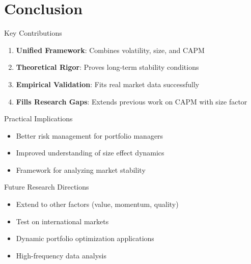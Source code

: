 \documentclass{beamer}
\begin{document}
\section{Conclusion}

\begin{frame}{Key Contributions}
\begin{enumerate}
    \item \textbf{Unified Framework}: Combines volatility, size, and CAPM
    \item \textbf{Theoretical Rigor}: Proves long-term stability conditions
    \item \textbf{Empirical Validation}: Fits real market data successfully
    \item \textbf{Fills Research Gaps}: Extends previous work on CAPM with size factor
\end{enumerate}

\vspace{0.5cm}
\begin{block}{Practical Implications}
\begin{itemize}
    \item Better risk management for portfolio managers
    \item Improved understanding of size effect dynamics
    \item Framework for analyzing market stability
\end{itemize}
\end{block}
\end{frame}

\begin{frame}{Future Research Directions}
\begin{itemize}
    \item Extend to other factors (value, momentum, quality)
    \item Test on international markets
    \item Dynamic portfolio optimization applications
    \item High-frequency data analysis
\end{itemize}
\end{frame}

\backmatter
\end{document}
